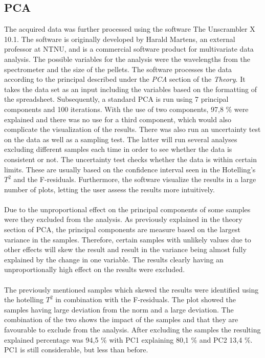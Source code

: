 \subsection{PCA}
The acquired data was further processed using the software The Unscrambler X 10.1. The software is originally developed by Harald Martens, an external professor at NTNU, and is a commercial software product for multivariate data analysis. The possible variables for the analysis were the wavelengths from the spectrometer and the size of the pellets. The software processes the data according to the principal described under the \textit{PCA} section of the \textit{Theory}. It takes the data set as an input including the variables based on the formatting of the spreadsheet. Subsequently, a standard PCA is run using 7 principal components and 100 iterations. With the use of two components, 97,8 \% were explained and there was no use for a third component, which would also complicate the visualization of the results. There was also run an uncertainty test on the data as well as a sampling test. The latter will run several analyses excluding different samples each time in order to see whether the data is consistent or not. The uncertainty test checks whether the data is within certain limits. These are usually based on the confidence interval seen in the Hotelling's $T^2$ and the F-residuals. Furthermore, the software visualize the results in a large number of plots, letting the user assess the results more intuitively. 
\\\\
Due to the unproportional effect on the principal components of some samples were they excluded from the analysis. As previously explained in the theory section of PCA, the principal components are measure based on the largest variance in the samples. Therefore, certain samples with unlikely values due to other effects will skew the result and result in the variance being almost fully explained by the change in one variable. The results clearly having an unproportionally high effect on the results were excluded.
\\\\%
The previously mentioned samples which skewed the results were identified using the hotelling $T^2$ in combination with the F-residuals. The plot showed the samples having large deviation from the norm and a large deviation. The combination of the two shows the impact of the samples and that they are favourable to exclude from the analysis. After excluding the samples the resulting explained percentage was 94,5 \% with PC1 explaining 80,1 \% and PC2 13,4 \%. PC1 is still considerable, but less than before.
